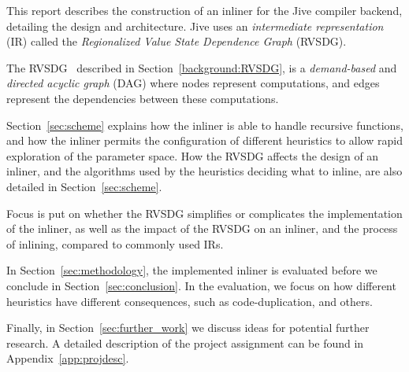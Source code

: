 This report describes the construction of an inliner for the Jive compiler
backend, detailing the design and architecture. Jive uses an
\textit{intermediate representation} (IR) called the \textit{Regionalized Value
State Dependence Graph} (RVSDG).

The RVSDG~\cite{RVSDG:HiPEACpaper} described in Section~\ref{background:RVSDG},
is a \textit{demand-based} and \textit{directed acyclic graph} (DAG) where nodes
represent computations, and edges represent the dependencies between these
computations.

Section~\ref{sec:scheme} explains how the inliner is able to handle recursive
functions, and how the inliner permits the configuration of different heuristics
to allow rapid exploration of the parameter space. How the RVSDG affects the
design of an inliner, and the algorithms used by the heuristics deciding what to
inline, are also detailed in Section~\ref{sec:scheme}.


Focus is put on whether the RVSDG simplifies or complicates the implementation
of the inliner, as well as the impact of the RVSDG on an inliner, and the
process of inlining, compared to
commonly used IRs.

In Section~\ref{sec:methodology}, the implemented inliner is evaluated
before we conclude in Section~\ref{sec:conclusion}. In the evaluation, we focus
on how different heuristics have different consequences, such as
code-duplication, and others.

Finally, in Section~\ref{sec:further_work} we discuss ideas for potential
further research. A detailed description of the project assignment can be found
in Appendix~\ref{app:projdesc}.
